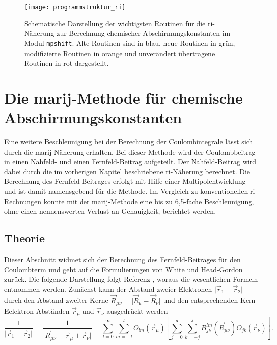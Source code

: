 \begin{figure}[ht!]
\centering
\texttt{[image: programmstruktur\_ri]}
\captionsetup{figurewithin = chapter}
\captionsetup{font=small, labelfont=bf}\caption[\ac{ri}-J-Routinen für chemische Abschirmungskonstanten]{Schematische Darstellung der wichtigsten Routinen für die \ac{ri}-Näherung zur Berechnung chemischer Abschirmungskonstanten im Modul \texttt{mpshift}. Alte Routinen sind in blau, neue Routinen in grün, modifizierte Routinen in orange und unverändert übertragene Routinen in rot dargestellt.}
\label{abb:programmstrukur_ri}
\end{figure}

\section{Die \acs{marij}-Methode für chemische Abschirmungskonstanten}\label{marij}
Eine weitere Beschleunigung bei der Berechnung der Coulombintegrale lässt sich durch die \acf{marij}-Näherung erhalten. Bei dieser Methode wird der Coulombbeitrag in einen Nahfeld- und einen Fernfeld-Beitrag aufgeteilt. Der Nahfeld-Beitrag wird dabei durch die im vorherigen Kapitel beschriebene \ac{ri}-Näherung berechnet. Die Berechnung des Fernfeld-Beitrages erfolgt mit Hilfe einer Multipolentwicklung und ist damit namensgebend für die Methode. Im Vergleich zu konventionellen \ac{ri}-Rechnungen konnte mit der \ac{marij}-Methode eine bis zu 6,5-fache Beschleunigung, ohne einen nennenswerten Verlust an Genauigkeit, berichtet werden.\supercite{sierka2003fast}

	\subsection{Theorie}
	Dieser Abschnitt widmet sich der Berechnung des Fernfeld-Beitrages für den Coulombterm und geht auf die Formulierungen von White und Head-Gordon\supercite{white1994derivation} zurück. Die folgende Darstellung folgt Referenz \cite{sierka2003fast}, woraus die wesentlichen Formeln entnommen werden. Zunächst kann der Abstand zweier Elektronen $\vert\vec{r}_1-\vec{r}_2\vert$ durch den Abstand zweiter Kerne $\vec{R}_{\mu\nu}=\vert\vec{R}_\mu-\vec{R}_\nu\vert$ und den entsprechenden Kern-Eelektron-Abständen $\vec{r}_\mu$ und $\vec{r}_\nu$ ausgedrückt werden
	\begin{equation}
	\frac{1}{\vert\vec{r}_1-\vec{r}_2\vert}=\frac{1}{\vert\vec{R}_{\mu\nu}-\vec{r}_\mu+\vec{r}_\nu\vert}=\sum_{l=0}^{\infty}\sum_{m=-l}^l O_{lm}(\vec{r}_\mu)\left[\sum_{j=0}^{\infty}\sum_{k=-j}^jB_{jk}^{lm}(\vec{R}_{\mu\nu})O_{jk}(\vec{r}_\nu)\right].
	\end{equation}
	
